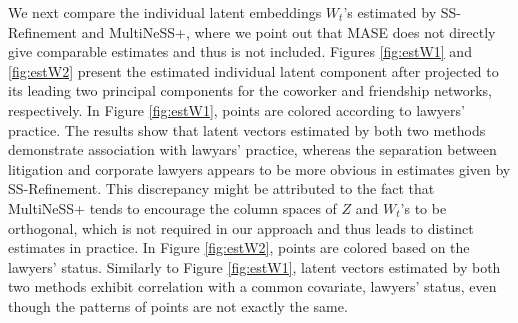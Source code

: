 \documentclass[12pt]{article}
\begin{document}
We next compare the individual latent embeddings $W_t$'s estimated by SS-Refinement and MultiNeSS+, where we point out that MASE does not directly give  comparable estimates and thus is not included.     
Figures \ref{fig:estW1} and \ref{fig:estW2}  present the estimated individual latent component  after projected to its leading two principal components for the coworker and friendship networks, respectively. 
In Figure \ref{fig:estW1}, points are colored according to lawyers’ practice. 
The results show that latent vectors estimated by both two methods  demonstrate association with lawyars' practice, whereas  the separation between litigation and corporate lawyers appears to be more  obvious in estimates given by SS-Refinement. 
This discrepancy might be attributed to the fact that MultiNeSS+ tends to encourage the column spaces of $Z$ and $W_t$'s to be orthogonal, which is not required in our approach and thus leads to distinct estimates in practice.   
In  Figure \ref{fig:estW2},  points are colored based on the lawyers’ status. 
Similarly to Figure \ref{fig:estW1}, 
latent vectors estimated by both two methods exhibit correlation with a common covariate, lawyers’ status,  even though the  patterns of points are not exactly the same.  
\end{document}
